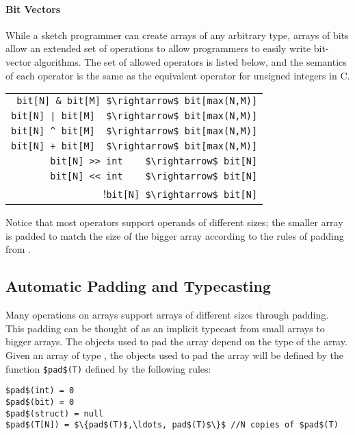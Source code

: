 \paragraph{Bit Vectors}
While a sketch programmer can create arrays of any arbitrary type, arrays of bits allow an extended set of operations to allow programmers to easily write bit-vector algorithms. The set of allowed operators is listed below, and the semantics of each operator is the same as the equivalent operator for unsigned integers in C.
\begin{center}
\begin{tabular}{r}
\lstinline!bit[N] & bit[M] $\rightarrow$ bit[max(N,M)]!\\
\lstinline!bit[N] | bit[M]  $\rightarrow$ bit[max(N,M)]!\\
\lstinline!bit[N] ^ bit[M]  $\rightarrow$ bit[max(N,M)]!\\
\lstinline!bit[N] + bit[M]  $\rightarrow$ bit[max(N,M)]!\\
\lstinline!bit[N] >> int    $\rightarrow$ bit[N]!\\
\lstinline!bit[N] << int    $\rightarrow$ bit[N]!\\
!\lstinline!bit[N] $\rightarrow$ bit[N]!\\
\end{tabular}
\end{center}

Notice that most operators support operands of different sizes; the smaller array is padded to match the size of the bigger array according to the rules of padding from . 





\subsection{Automatic Padding and Typecasting}
Many operations on arrays support arrays of different sizes through padding. This padding can be thought of as an implicit typecast from small arrays to bigger arrays. The objects used to pad the array depend on the type of the array. Given an array of type , the objects used to pad the array will be defined by the function \lstinline!$pad$(T)! defined by the following rules:
\begin{lstlisting}
$pad$(int) = 0 
$pad$(bit) = 0
$pad$(struct) = null
$pad$(T[N]) = $\{pad$(T)$,\ldots, pad$(T)$\}$ //N copies of $pad$(T)
\end{lstlisting}


